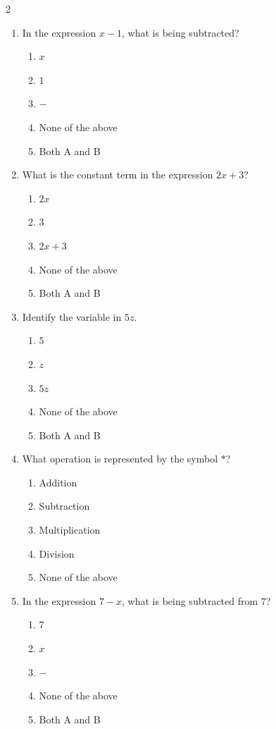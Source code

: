 \documentclass[10pt]{article}
\begin{document}
\begin{multicols}{2}
\begin{enumerate}[label=\textbf{Q\arabic*.}, leftmargin=*, itemsep=6pt, parsep=0pt]
  \item \small In the expression $x - 1$, what is being subtracted?
  \begin{enumerate}[label=(\Alph*), leftmargin=0.6cm, nosep, itemsep=2pt]
    \item $x$
    \item $1$
    \item $-$
    \item None of the above
    \item Both A and B
  \end{enumerate}

  \item \small What is the constant term in the expression $2x + 3$?
  \begin{enumerate}[label=(\Alph*), leftmargin=0.6cm, nosep, itemsep=2pt]
    \item $2x$
    \item $3$
    \item $2x + 3$
    \item None of the above
    \item Both A and B
  \end{enumerate}

  \item \small Identify the variable in $5z$.
  \begin{enumerate}[label=(\Alph*), leftmargin=0.6cm, nosep, itemsep=2pt]
    \item $5$
    \item $z$
    \item $5z$
    \item None of the above
    \item Both A and B
  \end{enumerate}

  \item \small What operation is represented by the symbol $*$?
  \begin{enumerate}[label=(\Alph*), leftmargin=0.6cm, nosep, itemsep=2pt]
    \item Addition
    \item Subtraction
    \item Multiplication
    \item Division
    \item None of the above
  \end{enumerate}

  \item \small In the expression $7 - x$, what is being subtracted from $7$?
  \begin{enumerate}[label=(\Alph*), leftmargin=0.6cm, nosep, itemsep=2pt]
    \item $7$
    \item $x$
    \item $-$
    \item None of the above
    \item Both A and B
  \end{enumerate}

\end{enumerate}
\end{multicols}
\end{document}
